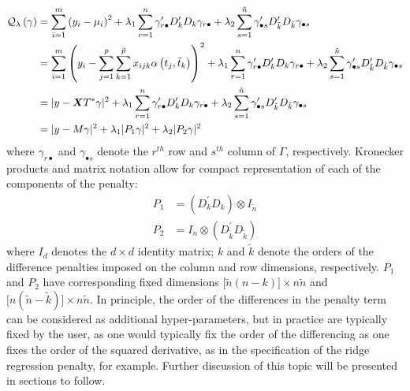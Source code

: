 \documentclass[12pt]{article}
\newcommand{\bfX}{\mbox{\boldmath $X$}}
\begin{document}
\begin{equation} \label{eq:bivariate_squared_diff_penalized_obj_function}
\begin{split}
\mathcal{Q}_\lambda\left(\gamma\right) &= \sum_{i=1}^m \left( y_i - \mu_i \right)^2 + \lambda_1 \sum_{r=1}^{n} \gamma_{r\bullet}^\prime D_k^\prime D_k \gamma_{r\bullet} 
+ \lambda_2 \sum_{s=1}^{\tilde{n}} \gamma_{\bullet s}^\prime D_{\tilde{k}}^\prime D_{\tilde{k}} \gamma_{\bullet s} \\
&= \sum_{i=1}^m \left( y_i - \sum_{j=1}^p \sum_{k=1}^{\tilde{p}} x_{ijk} \alpha\left(t_j,\tilde{t}_k\right) \right)^2 + \lambda_1 \sum_{r=1}^{n} \gamma_{r\bullet}^\prime D_k^\prime D_k \gamma_{r\bullet} + \lambda_2 \sum_{s=1}^{\tilde{n}} \gamma_{\bullet s}^\prime D_{\tilde{k}}^\prime D_{\tilde{k}} \gamma_{\bullet s} \\
 &=  \vert y - \bfX T^*\gamma \vert^2  + \lambda_1 \sum_{r=1}^{n} \gamma_{r\bullet}^\prime D_k^\prime D_k \gamma_{r\bullet} 
+ \lambda_2 \sum_{s=1}^{\tilde{n}} \gamma_{\bullet s}^\prime D_{\tilde{k}}^\prime D_{\tilde{k}} \gamma_{\bullet s}\\
 &=  \vert y - M\gamma \vert^2  + \lambda_1\vert P_1 \gamma \vert^2 + \lambda_2 \vert P_2 \gamma \vert^2 
\end{split}
\end{equation}
\noindent
where $\gamma_{r\bullet}$ and $\gamma_{\bullet s}$ denote the $r^{th}$ row and $s^{th}$ column of $\Gamma$, respectively. Kronecker products and matrix notation allow for compact representation of each of the components of the penalty:
\begin{equation} \label{eq:bivariate_squared_diff_penalty_projection_notation}
\begin{split}
P_1 &= \left( D_{k}^\prime D_k \right)\otimes I_{\tilde{n}}\\
P_2 &= I_{n}\otimes \left( D_{\tilde{k}}^\prime D_{\tilde{k}} \right)
\end{split}
\end{equation}
\noindent
where $I_{d}$ denotes the $d \times d$ identity matrix; $k$ and $\tilde{k}$ denote the orders of the difference penalties imposed on the column and row dimensions, respectively. $P_1$ and $P_2$ have corresponding fixed dimensions $\big[ \tilde{n} \left( n-k \right) \big] \times n\tilde{n}$ and $\big[ n \left(\tilde{n}-\tilde{k} \right) \big] \times n\tilde{n}$. In principle, the order of the differences in the penalty term can be considered as additional hyper-parameters, but in practice are typically fixed by the user, as one would typically fix the order of the differencing as one fixes the order of the squared derivative, as in the specification of the ridge regression penalty, for example. Further discussion of this topic will be presented in sections to follow.
\end{document}
